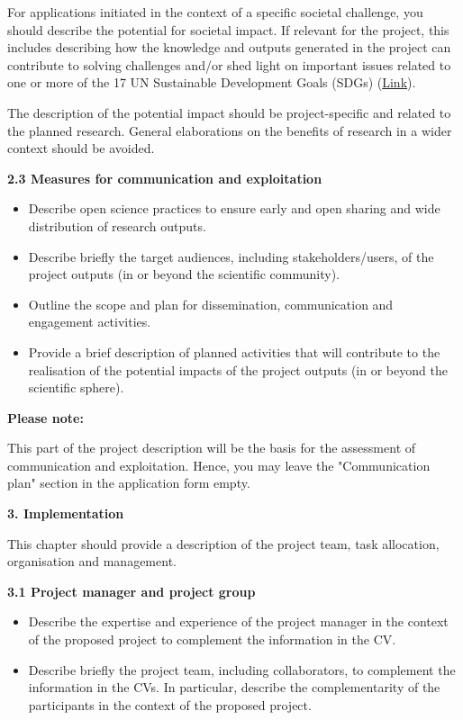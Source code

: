 \documentclass{nfr}
\begin{document}
For applications initiated in the context of a specific societal
challenge, you should describe the potential for societal impact. If
relevant for the project, this includes describing how the knowledge and
outputs generated in the project can contribute to solving challenges
and/or shed light on important issues related to one or more of the 17
UN Sustainable Development Goals (SDGs)
(\href{https://www.un.org/sustainabledevelopment/}{Link}).

The description of the potential impact should be project-specific and
related to the planned research. General elaborations on the benefits of
research in a wider context should be avoided.

\textbf{2.3 Measures for communication and exploitation}

\begin{itemize}
\item
  Describe open science practices to ensure early and open sharing and
  wide distribution of research outputs.
\item
  Describe briefly the target audiences, including stakeholders/users,
  of the project outputs (in or beyond the scientific community).
\item
  Outline the scope and plan for dissemination, communication and
  engagement activities.
\item
  Provide a brief description of planned activities that will contribute
  to the realisation of the potential impacts of the project outputs (in
  or beyond the scientific sphere).
\end{itemize}

\textbf{Please note:}

This part of the project description will be the basis for the
assessment of communication and exploitation. Hence, you may leave the
"Communication plan" section in the application form empty.

\textbf{3. Implementation}

This chapter should provide a description of the project team, task
allocation, organisation and management.

\textbf{3.1 Project manager and project group}

\begin{itemize}
\item
  Describe the expertise and experience of the project manager in the
  context of the proposed project to complement the information in the
  CV.
\item
  Describe briefly the project team, including collaborators, to
  complement the information in the CVs. In particular, describe the
  complementarity of the participants in the context of the proposed
  project.
\end{itemize}
\end{document}
